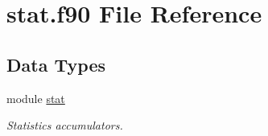 \hypertarget{stat_8f90}{\section{stat.\-f90 File Reference}
\label{stat_8f90}
}
\subsection*{Data Types}
\begin{DoxyCompactItemize}
\item 
module \hyperlink{classstat}{stat}
\begin{DoxyCompactList}\small\item\em Statistics accumulators. \end{DoxyCompactList}\end{DoxyCompactItemize}
